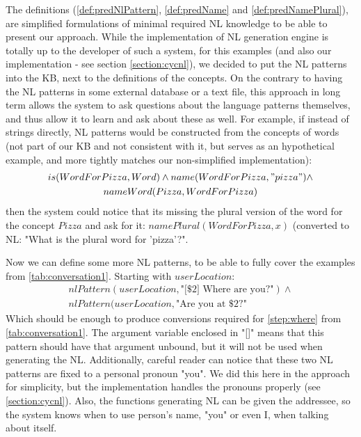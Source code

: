The definitions (\autoref{def:predNlPattern}, \autoref{def:predName} and
\autoref{def:predNamePlural}),
are simplified formulations of minimal required NL knowledge to be able to 
present our approach. While the implementation of NL generation engine is 
totally up to the developer of such a system, for this examples (and also 
our implementation - see section \ref{section:cycnl}), we decided to 
put the NL patterns
into the KB, next to the definitions of the concepts. On the contrary to
having the NL patterns in some external database or a text file, this approach
in long term allows the system to ask questions about the language patterns
themselves, and thus allow it to learn and ask about these as well. For example,
if instead of strings directly, NL patterns would be constructed from the 
concepts of words (not part of our KB and not consistent with it, but serves 
as an hypothetical example, and more tightly matches our non-simplified 
implementation):
\begin{equation*}
\begin{gathered}
is(WordForPizza, Word) \land name(WordForPizza, "pizza")\land\\
nameWord(Pizza,WordForPizza)
\end{gathered}
\end{equation*}
then the system could notice that its missing the plural version of the word
for the concept $Pizza$ and ask for it: $namePlural(WordForPizza,x)$ 
(converted to NL: "What is the plural word for 'pizza'?".

Now we can define some more NL patterns, to be able to fully cover the
examples from \autoref{tab:conversation1}. Starting with $userLocation$:
\begin{equation}\label{as:nl:userLocation}
\begin{gathered}
    nlPattern(userLocation,\text{"[\$2] Where are you?"}) \land \\
    nlPattern(userLocation,\text{"Are you at \$2?"}
\end{gathered}
\end{equation}
Which should be enough to produce conversions required for \autoref{step:where}
from \autoref{tab:conversation1}. The argument variable enclosed in "[]" means
that this pattern should have that argument unbound, but it will not be 
used when generating the NL. Additionally, careful reader can notice that these
two NL patterns are fixed to a personal pronoun "you". We did this here in the
approach for simplicity, but the implementation handles the pronouns properly
(see \autoref{section:cycnl}). Also, the functions generating NL can be given
the addressee, so the system knows when to use person's name, "you" or even
I, when talking about itself.

